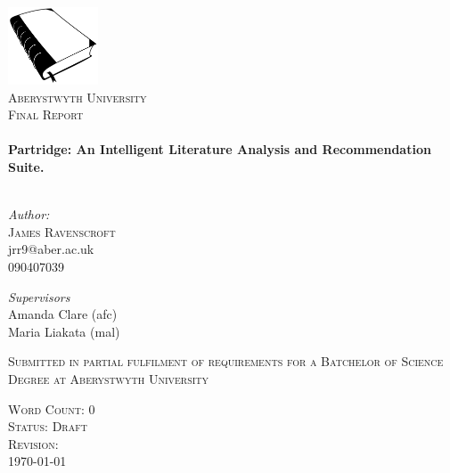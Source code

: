\begin{titlepage}
 
\begin{center}

\includegraphics[width=0.20\textwidth]{../cover_logo.png}\\[1cm]


\textsc{\LARGE Aberystwyth University}\\[0.5cm]
\textsc{\LARGE Final Report}\\[0.5cm]



 
\HRule \\[0.4cm]
{ \huge \bfseries Partridge: An Intelligent Literature Analysis and
Recommendation Suite.}\\[0.4cm]

\HRule \\[1.5cm]

\begin{minipage}{0.4\textwidth}
\begin{flushleft} \large
\emph{Author:}\\
\textsc{James Ravenscroft}\\
jrr9@aber.ac.uk\\
090407039\\
\end{flushleft}
\end{minipage}
\begin{minipage}{0.4\textwidth}
\begin{flushright} \large
\emph{Supervisors} \\
Amanda Clare (afc)\\
Maria Liakata (mal)

\end{flushright}
\end{minipage}


\vfill

\textsc{Submitted in partial fulfilment of requirements for a Batchelor of
Science Degree at Aberystwyth University}



\vfill
 
\textsc{\large Word Count: 0}\\
\textsc{\large Status: Draft}\\
\textsc{\large Revision: \Revision{} }\\
{\large \today}
 
\end{center}

\frontmatter
 
\end{titlepage}

